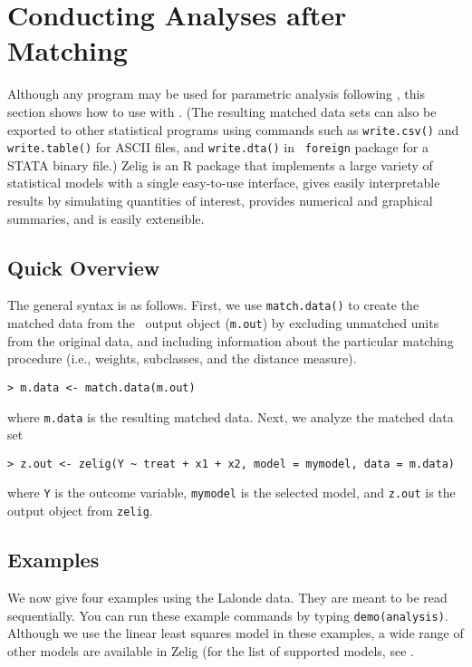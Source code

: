 \section{Conducting Analyses after Matching}
\label{sec:analysis}

Although any program may be used for parametric analysis following
\MatchIt, this section shows how to use
 with \MatchIt.  (The
resulting matched data sets can also be exported to other statistical
programs using commands such as {\tt write.csv()} and {\tt
  write.table()} for ASCII files, and {\tt write.dta()} in {\tt
  foreign} package for a STATA binary file.)  Zelig
\citep{ImaKinLau06} is an R package that implements a large variety of
statistical models with a single easy-to-use interface, gives easily
interpretable results by simulating quantities of interest, provides
numerical and graphical summaries, and is easily extensible.

\subsection{Quick Overview}

The general syntax is as follows. First, we use \texttt{match.data()}
to create the matched data from the \MatchIt\ output object
(\texttt{m.out}) by excluding unmatched units from the original data,
and including information about the particular matching procedure
(i.e., weights, subclasses, and the distance measure).
\begin{verbatim}
> m.data <- match.data(m.out)
\end{verbatim}
where {\tt m.data} is the resulting matched data.  Next, we analyze
the matched data set
\begin{verbatim}
> z.out <- zelig(Y ~ treat + x1 + x2, model = mymodel, data = m.data)
\end{verbatim}
where {\tt Y} is the outcome variable, {\tt mymodel} is the selected
model, and {\tt z.out} is the output object from {\tt zelig}.

\subsection{Examples}

We now give four examples using the Lalonde data.  They are meant to
be read sequentially.  You can run these example commands by typing
{\tt demo(analysis)}.  Although we use the linear least squares model
in these examples, a wide range of other models are available in Zelig
(for the list of supported models, see
.

